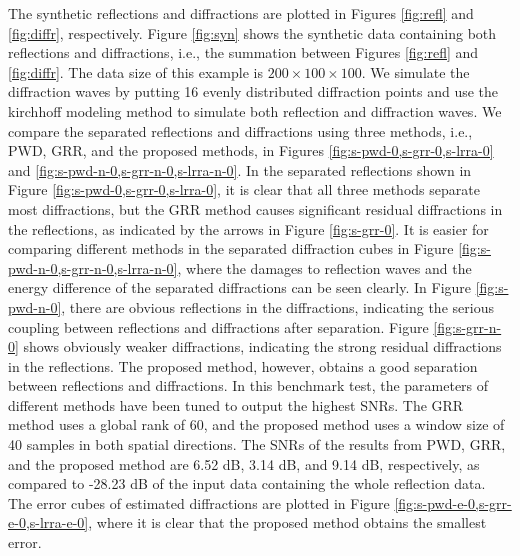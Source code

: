 \documentclass[10pt]{IEEEtran}
\DeclareRobustCommand{\new}[1]{#1}
\begin{document}
The synthetic reflections and diffractions are plotted in Figures \ref{fig:refl} and \ref{fig:diffr}, respectively. Figure \ref{fig:syn} shows the synthetic data containing both reflections and diffractions, i.e., the summation between Figures \ref{fig:refl} and \ref{fig:diffr}. The data size of this example is $200\times 100\times 100$. We simulate the diffraction waves by putting 16 evenly distributed diffraction points and use the kirchhoff modeling method to simulate both reflection and diffraction waves. We compare the separated reflections and diffractions using three methods, i.e., PWD, GRR, and the proposed methods, in Figures \ref{fig:s-pwd-0,s-grr-0,s-lrra-0} and \ref{fig:s-pwd-n-0,s-grr-n-0,s-lrra-n-0}. 
In the separated reflections shown in Figure \ref{fig:s-pwd-0,s-grr-0,s-lrra-0}, it is clear that all three methods separate most diffractions, but the GRR method causes significant residual diffractions in the reflections, as indicated by the arrows in Figure \ref{fig:s-grr-0}. 
It is easier for comparing different methods in the separated diffraction cubes in Figure \ref{fig:s-pwd-n-0,s-grr-n-0,s-lrra-n-0}, where the damages to reflection waves and the energy difference of the separated diffractions can be seen clearly. In Figure \ref{fig:s-pwd-n-0}, there are obvious reflections in the diffractions, indicating the serious coupling between reflections and diffractions after separation. Figure \ref{fig:s-grr-n-0} shows obviously weaker diffractions, indicating the strong residual diffractions in the reflections. The proposed method, however, obtains a good separation between reflections and diffractions. In this benchmark test, the parameters of different methods have been tuned to output the highest SNRs. The GRR method uses a global rank of 60, and the proposed method uses a window size of 40 samples in both spatial directions. The SNRs of the results from PWD, GRR, and the proposed method are 6.52 dB, 3.14 dB, and 9.14 dB, respectively, as compared to -28.23 dB of the input data containing the whole reflection data. \new{The error cubes of estimated diffractions are plotted in Figure \ref{fig:s-pwd-e-0,s-grr-e-0,s-lrra-e-0}, where it is clear that the proposed method obtains the smallest error.}





\end{document}
